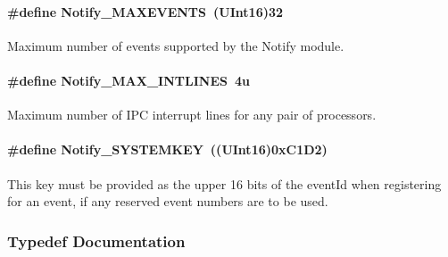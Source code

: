 \paragraph[{Notify\_\-MAXEVENTS}]{\setlength{\rightskip}{0pt plus 5cm}\#define Notify\_\-MAXEVENTS~(UInt16)32}\hfill\label{_notify_8h_afb698e2a48abcb1b698e80a16b38bf43}


Maximum number of events supported by the Notify module. 

\paragraph[{Notify\_\-MAX\_\-INTLINES}]{\setlength{\rightskip}{0pt plus 5cm}\#define Notify\_\-MAX\_\-INTLINES~4u}\hfill\label{_notify_8h_a67e0ce1661274a428248b143dd41dbfc}


Maximum number of IPC interrupt lines for any pair of processors. 

\paragraph[{Notify\_\-SYSTEMKEY}]{\setlength{\rightskip}{0pt plus 5cm}\#define Notify\_\-SYSTEMKEY~((UInt16)0xC1D2)}\hfill\label{_notify_8h_ac33600d8704857ef0afbbee3d4ce6d80}


This key must be provided as the upper 16 bits of the eventId when registering for an event, if any reserved event numbers are to be used. 



\subsubsection{Typedef Documentation}
\paragraph[{Notify\_\-FnNotifyCbck}]{}\hfill\label{_notify_8h_ab362f7571ee3d7f7abaa743914edcd62}



